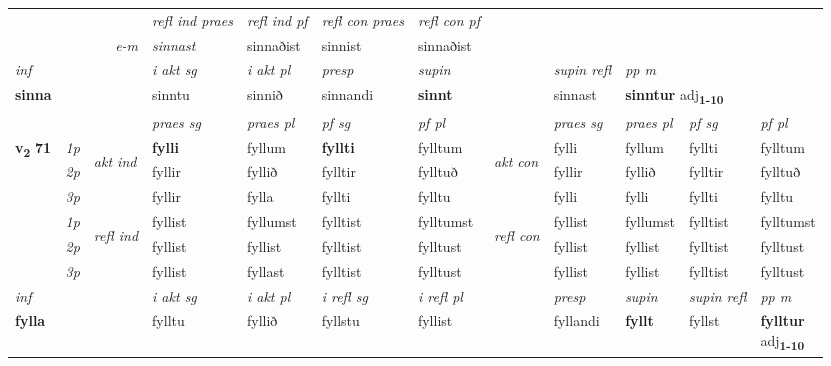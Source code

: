 \begin{longtable}[l]{X>{\footnotesize\itshape}llXXXXlXXXX}
 & && \textit{refl ind praes} & \textit{refl ind pf} & \textit{refl con praes} & \textit{refl con pf} \\*
\multicolumn{3}{r}{\textit{e-m}}& sinnast & sinnaðist & sinnist & sinnaðist \\*

\cmidrule{4-7}
   {\textit{inf}} & &  & \textit{i akt sg} & \textit{i akt pl}   & \textit{presp} & \textit{supin} && \textit{supin refl} & \textit{pp m} \\*
  {\textbf{sinna}} & && sinntu  & sinnið   & sinnandi &  \textbf{sinnt} && sinnast & \multicolumn{2}{l}{\textbf{sinntur} adj\textbf{\textsubscript{1-10}}} \\*

\midrule

 & &   & \textit{praes sg}  & \textit{praes pl}    & \textit{ pf sg} & \textit{pf pl} & & \textit{praes sg}  & \textit{praes pl}    & \textit{pf sg} & \textit{pf pl }  \\ \cmidrule{4-7} \cmidrule{9-12}
 \multirow{2}{*}{{{\textbf{v{\textsubscript{2}}} \Large{\textbf{71}}}}}  & 1p & \multirow{3}{*}{\begin{turn}{90}\textit{akt ind}\end{turn}} & \textbf{fylli} & fyllum & \textbf{fyllti} & fylltum & \multirow{3}{*}{\begin{turn}{90}\textit{akt con}\end{turn}} &fylli & fyllum & fyllti & fylltum\\*
 & 2p &  &  fyllir  & fyllið & fylltir & fylltuð & & fyllir & fyllið & fylltir & fylltuð \\*
 & 3p &  & fyllir & fylla & fyllti & fylltu & & fylli & fylli& fyllti & fylltu \\*
\cmidrule{4-7} \cmidrule{9-12}
 & 1p & \multirow{3}{*}{\begin{turn}{90}\textit{refl ind}\end{turn}}  & fyllist & fyllumst & fylltist & fylltumst & \multirow{3}{*}{\begin{turn}{90}\textit{refl con}\end{turn}}  &fyllist & fyllumst & fylltist & fylltumst \\*
 & 2p &  & fyllist & fyllist & fylltist & fylltust & &fyllist & fyllist & fylltist & fylltust \\*
 & 3p  & & fyllist & fyllast & fylltist & fylltust & & fyllist & fyllist& fylltist & fylltust \\*
\cmidrule{4-7} \cmidrule{9-12}

   {\textit{inf}} & &  & \textit{i akt sg} & \textit{i akt pl} & \textit{i refl sg} & \textit{i refl pl} && \textit{presp} & \textit{supin} & \textit{supin refl} & \textit{pp m} \\*
  {\textbf{fylla}} & && fylltu  & fyllið & fyllstu & fyllist && fyllandi &  \textbf{fyllt} & fyllst & \specialcell{\textbf{fylltur} \\ adj\textbf{\textsubscript{1-10}}} \\*


\end{longtable}
